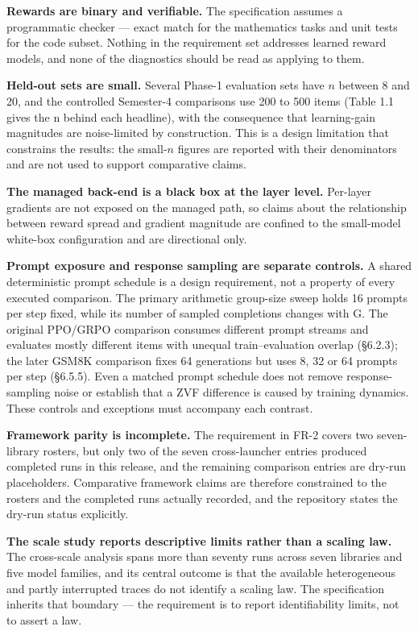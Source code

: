 \documentclass[12pt,a4paper]{report}
\begin{document}
\textbf{Rewards are binary and verifiable.} The specification assumes a
programmatic checker --- exact match for the mathematics tasks and unit
tests for the code subset. Nothing in the requirement set addresses
learned reward models, and none of the diagnostics should be read as
applying to them.

\textbf{Held-out sets are small.} Several Phase-1 evaluation sets have
\(n\) between 8 and 20, and the controlled Semester-4 comparisons use
200 to 500 items (Table 1.1 gives the n behind each headline), with the
consequence that learning-gain magnitudes are noise-limited by
construction. This is a design limitation that constrains the results:
the small-\(n\) figures are reported with their denominators and are not
used to support comparative claims.

\textbf{The managed back-end is a black box at the layer level.}
Per-layer gradients are not exposed on the managed path, so claims about
the relationship between reward spread and gradient magnitude are
confined to the small-model white-box configuration and are directional
only.

\textbf{Prompt exposure and response sampling are separate controls.} A
shared deterministic prompt schedule is a design requirement, not a
property of every executed comparison. The primary arithmetic group-size
sweep holds 16 prompts per step fixed, while its number of sampled
completions changes with G. The original PPO/GRPO comparison consumes
different prompt streams and evaluates mostly different items with
unequal train--evaluation overlap (§6.2.3); the later GSM8K comparison
fixes 64 generations but uses 8, 32 or 64 prompts per step (§6.5.5).
Even a matched prompt schedule does not remove response-sampling noise
or establish that a ZVF difference is caused by training dynamics. These
controls and exceptions must accompany each contrast.

\textbf{Framework parity is incomplete.} The requirement in FR-2 covers
two seven-library rosters, but only two of the seven cross-launcher
entries produced completed runs in this release, and the remaining
comparison entries are dry-run placeholders. Comparative framework
claims are therefore constrained to the rosters and the completed runs
actually recorded, and the repository states the dry-run status
explicitly.

\textbf{The scale study reports descriptive limits rather than a scaling
law.} The cross-scale analysis spans more than seventy runs across seven
libraries and five model families, and its central outcome is that the
available heterogeneous and partly interrupted traces do not identify a
scaling law. The specification inherits that boundary --- the
requirement is to report identifiability limits, not to assert a law.
\end{document}
